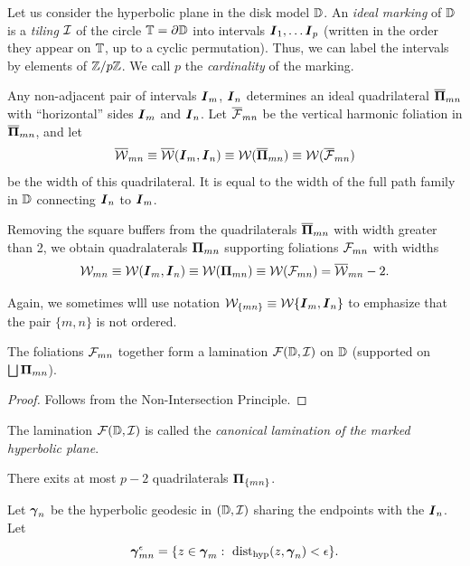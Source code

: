  
  Let us consider the hyperbolic plane in the disk model ${\Bbb D}$. 
An {\it ideal marking } of ${\Bbb D}$ is a {\em tiling}  ${\mathcal I}$
of the circle  ${\Bbb T}=\partial {\Bbb D}$ into intervals ${\boldsymbol{I}}_1, \dots {\boldsymbol{I}}_p$
(written in the order they appear on ${\Bbb T}$, up to a cyclic permutation). 
Thus, we can label the intervals by elements of ${\Bbb Z}/ p{\Bbb Z}$. 
We call $p$ the {\it cardinality } of the marking. 

Any non-adjacent pair of intervals ${\boldsymbol{I}}_m$, ${\boldsymbol{I}}_n$
determines an ideal quadrilateral $\overline {{\boldsymbol{\Pi}}}_{mn}$ with ``horizontal'' sides ${\boldsymbol{I}}_m $ and  ${\boldsymbol{I}}_n $.
Let $\overline {{\mathcal F}}_{mn}$ be the vertical harmonic foliation in $\overline {{\boldsymbol{\Pi}}}_{mn}$,
and let  
$$
   \overline {{\mathcal W}}_{mn}\equiv \overline {{\mathcal W}}({\boldsymbol{I}}_m, {\boldsymbol{I}}_n) \equiv {\mathcal W} (\overline  {{\boldsymbol{\Pi}}}_{mn} ) \equiv {\mathcal W}(\overline {{\mathcal F}}_{mn} )
$$ 
be the width of this quadrilateral.
It is equal to the width of the full path family in ${\Bbb D}$  connecting ${\boldsymbol{I}}_n$ to ${\boldsymbol{I}}_m$. 

Removing  the square buffers from the  quadrilaterals $\overline {{\boldsymbol{\Pi}}}_{mn}$
with width  greater than 2,
we obtain quadralaterals ${\boldsymbol{\Pi}}_{mn}$ supporting foliations ${\mathcal F}_{mn}$
with widths
$$
  {\mathcal W}_{mn} \equiv  {\mathcal W}({\boldsymbol{I}}_m, {\boldsymbol{I}}_n) \equiv {\mathcal W} ({\boldsymbol{\Pi}}_{mn}  ) \equiv
  {\mathcal W}({\mathcal F}_{mn} )  = \overline {{\mathcal W}}_{mn} -2. 
$$

\begin{rem}
   Again, we sometimes wlll use notation  ${\mathcal W}_{\{ mn\} } \equiv
   {\mathcal W}\{{\boldsymbol{I}}_m, {\boldsymbol{I}}_n\}$ to emphasize that the pair $\{m,n\}$ is not
   ordered. 
\end{rem}

\begin{lem}\label{canon fol}
    The foliations ${\mathcal F}_{mn}$ together  form a lamination
    ${\mathcal F}({\Bbb D},{\mathcal I})$   on ${\Bbb D}$ (supported on $\bigsqcup {\boldsymbol{\Pi}}_{mn}$).  
\end{lem}

\begin{proof}
  Follows from the Non-Intersection Principle.
\end{proof}

The lamination ${\mathcal F}({\Bbb D},{\mathcal I})$ is called the {\it canonical lamination
of the  marked hyperbolic plane}. 

\begin{cor}
   There exits at most $p-2$ quadrilaterals ${\boldsymbol{\Pi}}_{\{mn\}} $.
\end{cor}


Let ${\boldsymbol{\gamma}}_n$ be the hyperbolic geodesic in $({\Bbb D}, {\mathcal I})$ sharing the
endpoints with the ${\boldsymbol{I}}_n$.
Let
$$
{\boldsymbol{\gamma}}^{\epsilon}_{mn}= \{ z\in{\boldsymbol{\gamma}}_m : \ \operatorname{dist}_{\mathrm{hyp}} (z, {\boldsymbol{\gamma}}_n) < {\epsilon}\}.
$$
%
%

